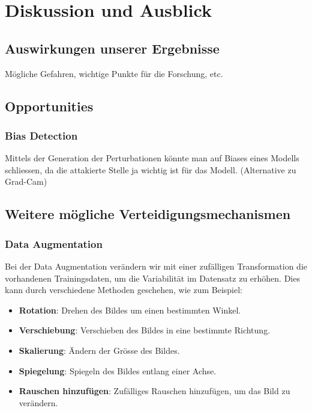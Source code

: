 \section{Diskussion und Ausblick}

\subsection{Auswirkungen unserer Ergebnisse}
Mögliche Gefahren, wichtige Punkte für die Forschung, etc.

\subsection{Opportunities}
\subsubsection{Bias Detection}
Mittels der Generation der Perturbationen könnte man auf Biases eines Modells schliessen, da die attakierte Stelle ja wichtig ist für das Modell. (Alternative zu Grad-Cam)

\subsection{Weitere mögliche Verteidigungsmechanismen}



\subsubsection{Data Augmentation}


Bei der Data Augmentation verändern wir mit einer zufälligen Transformation die vorhandenen Trainingsdaten, um die Variabilität im Datensatz zu erhöhen. Dies kann durch verschiedene Methoden geschehen, wie zum Beispiel:

\begin{itemize}
    \item \textbf{Rotation}: Drehen des Bildes um einen bestimmten Winkel.
    \item \textbf{Verschiebung}: Verschieben des Bildes in eine bestimmte Richtung.
    \item \textbf{Skalierung}: Ändern der Grösse des Bildes.
    \item \textbf{Spiegelung}: Spiegeln des Bildes entlang einer Achse.
    \item \textbf{Rauschen hinzufügen}: Zufälliges Rauschen hinzufügen, um das Bild zu verändern.
\end{itemize}

